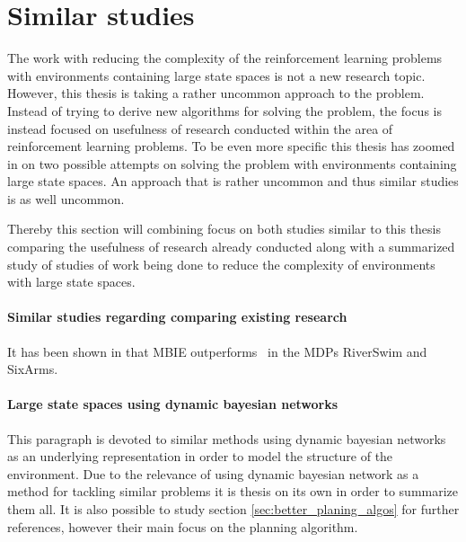 \section{Similar studies }

The work with reducing the complexity of the reinforcement learning problems
with environments containing large state spaces is not a new research topic.
However, this thesis is taking a rather uncommon approach to the problem.
Instead of trying to derive new algorithms for solving the problem, the focus
is instead focused on usefulness of research conducted within the area of
reinforcement learning problems. To be even more specific this thesis has
zoomed in on two possible attempts on solving the problem with environments
containing large state spaces. An approach that is rather uncommon and thus
similar studies is as well uncommon. 


Thereby this section will combining focus on both studies similar to this
thesis comparing the usefulness of research already conducted along with a
summarized study of studies of work being done to reduce the complexity of
environments with large state spaces.


\paragraph{Similar studies regarding comparing existing research}


It has been shown in \parencite{strehl2004empirical} that MBIE outperforms
\etre\ in the MDPs RiverSwim and SixArms. \parencite{dietterich2013pac}


\paragraph{Large state spaces using dynamic bayesian networks}

This paragraph is devoted to similar methods using dynamic bayesian networks as an underlying representation in order to model the structure of the environment. Due to the relevance of using dynamic bayesian network as a method for tackling similar problems it is thesis on its own in order to summarize them all. It is also possible to study section \ref{sec:better_planing_algos} for further references, however their main focus on the planning algorithm.

